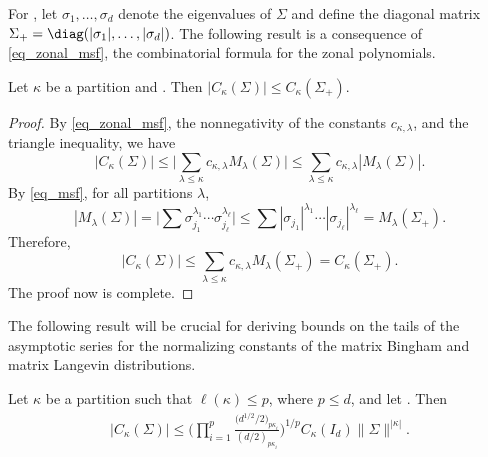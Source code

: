 For , let $\sigma_1,\ldots,\sigma_d$ denote the eigenvalues of $\Sigma$ and define the diagonal matrix $\Sigma_+ = \diag(|\sigma_1|,\ldots,|\sigma_d|)$. The following result is a consequence of \eqref{eq_zonal_msf}, the combinatorial formula for the zonal polynomials.

\begin{Lemma}
\label{lem_zonal_psd}
Let $\kappa$ be a partition and . Then $|C_\kappa(\Sigma)| \le C_\kappa(\Sigma_+)$.
\end{Lemma}

\begin{proof}
By \eqref{eq_zonal_msf}, the nonnegativity of the constants $c_{\kappa,\lambda}$, and the triangle inequality, we have
\[
|C_\kappa(\Sigma)| \le \boldsymbol{\bigg|}\sum_{\lambda \le \kappa} c_{\kappa,\lambda} M_\lambda(\Sigma)\boldsymbol{\bigg|}
\le \sum_{\lambda \le \kappa} c_{\kappa,\lambda} |M_\lambda(\Sigma)|.
\]
By \eqref{eq_msf}, for all partitions $\lambda$,
\[
|M_\lambda(\Sigma)| = \boldsymbol{\Big|}\sum \sigma_{j_1}^{\lambda_1} \cdots \sigma_{j_\ell}^{\lambda_\ell}\boldsymbol{\Big|}
\le \sum |\sigma_{j_1}|^{\lambda_1} \cdots |\sigma_{j_\ell}|^{\lambda_\ell}
= M_\lambda(\Sigma_+).
\]
Therefore, \[
|C_\kappa(\Sigma)| \le \sum_{\lambda \le \kappa} c_{\kappa,\lambda} M_\lambda(\Sigma_+) =
C_\kappa(\Sigma_+).
\]
The proof now is complete.
\end{proof}



The following result will be crucial for deriving bounds on the tails of the asymptotic series for the normalizing constants of the matrix Bingham and matrix Langevin distributions.

\begin{Proposition}
\label{prop_zonal_bound}
Let $\kappa$ be a partition such that $\ell(\kappa) \le p$, where $p \le d$, and let . Then
\begin{gather}
\label{eq_zonal_bound}
|C_\kappa(\Sigma)| \le \Bigg(\prod_{i=1}^p \frac{\bigl(d^{1/2}/2\bigr)_{p \kappa_i}}{(d/2)_{p \kappa_i}}\Bigg)^{1/p} C_\kappa(I_d) \|\Sigma\|^{|\kappa|}.
\end{gather}
\end{Proposition}

